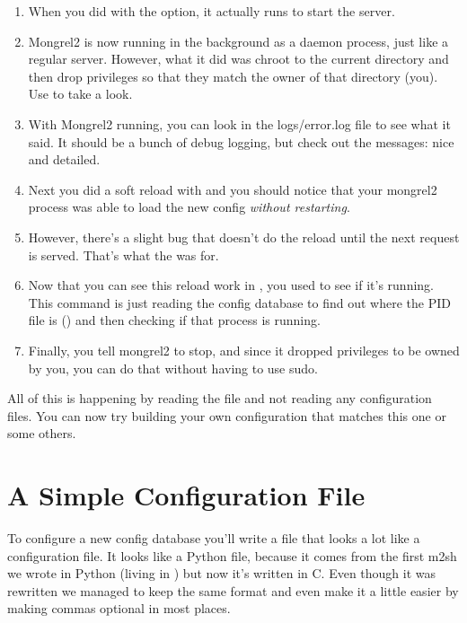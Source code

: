 \begin{enumerate}
\item When you did  with the  option, it actually runs
     to start the server.
\item Mongrel2 is now running in the background as a daemon process, just like a regular server.
    However, what it did was chroot to the current directory and then drop privileges so that
    they match the owner of that directory (you).  Use  to take a look.
\item With Mongrel2 running, you can look in the logs/error.log file to see what it said.  It should
    be a bunch of debug logging, but check out the messages: nice and detailed.
\item Next you did a soft reload with  and you should notice that your mongrel2
    process was able to load the new config \emph{without restarting}.
\item However, there's a slight bug that doesn't do the reload until the next request is served. That's
    what the  was for.
\item Now that you can see this reload work in , you used  to
    see if it's running.  This command is just reading the config database to find out where the PID file
    is () and then checking if that process is running.
\item Finally, you tell mongrel2 to stop, and since it dropped privileges to be owned by you, you can do
    that without having to use sudo.
\end{enumerate}

All of this is happening by reading the  file and not reading any configuration
files.  You can now try building your own configuration that matches this one or some others.


\section{A Simple Configuration File}

To configure a new config database you'll write a file that looks a lot like
a configuration file.  It looks like a Python file, because it comes from the
first m2sh we wrote in Python (living in ) but now it's
written in C.  Even though it was rewritten we managed to keep the same format
and even make it a little easier by making commas optional in most places.

